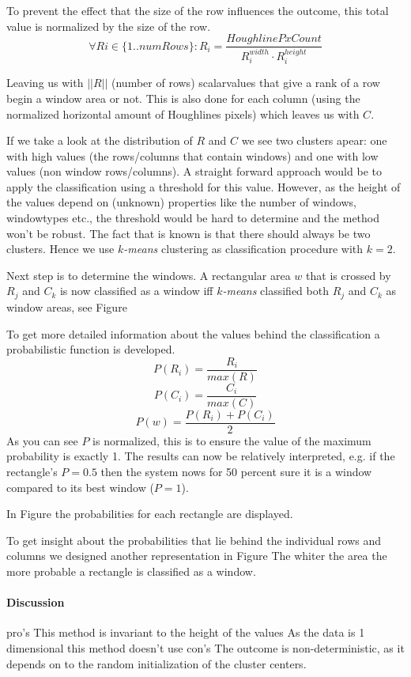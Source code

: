 To prevent the effect that the size of the row influences the outcome, this total value
is normalized by the size of the row.
\[\forall Ri\in \{1..numRows\} : R_i = \frac{HoughlinePxCount}{R_i^{width} \cdot R_i^{height}}\]

Leaving us with $||R||$ (number of rows) scalarvalues that give a rank of a row begin a window area or not.
This is also done for each column (using the normalized horizontal amount of
Houghlines pixels) which leaves us with $C$.

If we take a look at the distribution of $R$ and $C$ we see two clusters apear: one with
high values (the rows/columns that contain windows) and one with low values (non window
rows/columns).  A straight forward approach would be to apply the classification using a
threshold for this value.  However, as the height of the values depend on
(unknown) properties like the number of windows, windowtypes etc., the threshold
would be hard to determine and the method won't be robust. The fact that is
known is that there should always be two clusters. Hence we use \emph{$k$-means}
clustering as classification procedure with $k=2$.

Next step is to determine the windows.
A rectangular area $w$ that is crossed by $R_j$ and $C_k$ is now classified as a
window iff \emph{$k$-means} classified both $R_j$ and $C_k$ as window areas, see
Figure %

To get more detailed information about the values behind the classification a
probabilistic function is developed. 
\[P(R_i) = \frac{R_i}{max(R)}\]
\[P(C_i) = \frac{C_i}{max(C)}\]
\[P(w) = \frac{P(R_i) + P(C_i)}{2}\]
As you can see $P$ is normalized, this is to ensure the value of the maximum
probability is exactly 1. The results can now be relatively interpreted, e.g. if the rectangle's $P=0.5$
then the system nows for 50 percent sure it is a window compared to its best window ($P=1$).

In Figure %
the probabilities for each rectangle are displayed.

To get insight about the probabilities that lie behind the individual rows and columns
we designed another representation in Figure %
The whiter the area the more probable a rectangle is classified as a window.

\paragraph{Discussion}
pro's 
This method is invariant to the height of the values
As the data is 1 dimensional this method doesn't use 
con's
The outcome is non-deterministic, as it depends on to the random initialization of the cluster centers.


